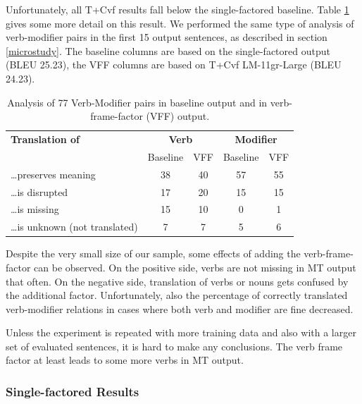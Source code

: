 \documentclass[10pt]{report}
\theoremstyle{plain}
\begin{document}
{{Unfortunately, all T+Cvf results fall below the single-factored baseline.
Table \ref{vffanalysis} gives some more detail on this result. We performed the
same type of analysis of verb-modifier pairs in the first 15 output sentences,
as described in section \ref{microstudy}. The baseline columns are based on the
single-factored output (BLEU 25.23), the VFF columns are based on T+Cvf
LM-11gr-Large (BLEU 24.23).


\begin{table}[ht]
\begin{center}
\begin{tabular}{lcc|cc}
\bf Translation of  &  \multicolumn{2}{c}{\bf Verb}  &  \multicolumn{2}{c}{\bf Modifier}\\
      &  Baseline  &  VFF  &  Baseline  &  VFF\\
\hline
\dots{}preserves meaning    &     38  &    40  &     57  &    55\\
\dots{}is disrupted   &     17  &    20  &     15  &    15\\
\dots{}is missing  &     15  &    10  &      0  &     1\\
\dots{}is unknown (not translated)   &      7  &     7  &      5  &     6\\
\end{tabular}
\end{center}
\caption{Analysis of 77 Verb-Modifier pairs in baseline output and in
verb-frame-factor (VFF) output.}
\label{vffanalysis}
\end{table}

Despite the very small size of our sample, some effects
of adding the verb-frame-factor can be observed. On the positive side, verbs are
not missing in MT output that often. On the negative side, translation of verbs
or nouns gets confused by the additional factor. Unfortunately, also the
percentage of correctly translated verb-modifier relations in cases where both
verb and modifier are fine decreased.

Unless the experiment is repeated with more training data and also with a larger
set of evaluated sentences, it is hard to make any conclusions. The
verb frame factor at least leads to some more verbs in MT output.








\subsubsection{Single-factored Results \toen{}}

}}
\end{document}
